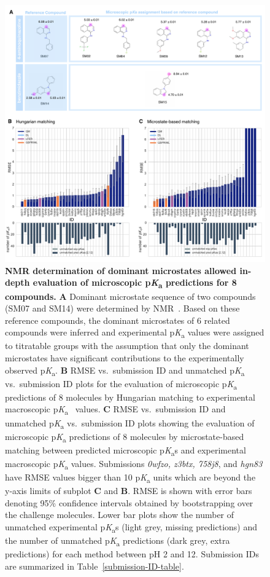 \documentclass[9pt,lineno,final]{elife}
\newcommand{\pKa}{p\textit{K}\textsubscript{a}}
\begin{document}
\begin{figure}
\centering
\includegraphics[width=1.0\linewidth]{figures/typeI_8_mol_matching_comparison.pdf}
\caption{{\bf NMR determination of dominant microstates allowed in-depth evaluation of microscopic \pKa{} predictions for 8 compounds.} 
{\bf A} Dominant microstate sequence of two compounds (SM07 and SM14) were determined by NMR~\cite{Isik:2018:J.Comput.AidedMol.Des.}. 
Based on these reference compounds, the dominant microstates of 6 related compounds were inferred and experimental \pKa{} values were assigned to titratable groups with the assumption that only the dominant microstates have significant contributions to the experimentally observed \pKa{}.
{\bf B} RMSE vs.\ submission ID and unmatched \pKa{} vs.\ submission ID plots for the evaluation of microscopic \pKa{} predictions of 8 molecules by Hungarian matching to experimental macroscopic \pKa{}~ values. 
{\bf C} RMSE vs.\ submission ID and unmatched \pKa{} vs.\ submission ID plots showing the evaluation of microscopic \pKa{} predictions of 8 molecules by microstate-based matching between predicted microscopic \pKa{}s and experimental macroscopic \pKa{} values. Submissions \textit{0wfzo, z3btx, 758j8}, and \textit{hgn83} have RMSE values bigger than 10 \pKa{} units which are beyond the y-axis limits of subplot {\bf C} and {\bf B}.
RMSE is shown with error bars denoting 95\% confidence intervals obtained by bootstrapping over the challenge molecules. 
Lower bar plots show the number of unmatched experimental \pKa{}s (light grey, missing predictions) and the number of unmatched \pKa{} predictions (dark grey, extra predictions) for each method between pH 2 and 12. 
Submission IDs are summarized in Table~\ref{submission-ID-table}.
}
\label{fig:typeI-matching-algorithm-comparison}
\end{figure}
\end{document}
